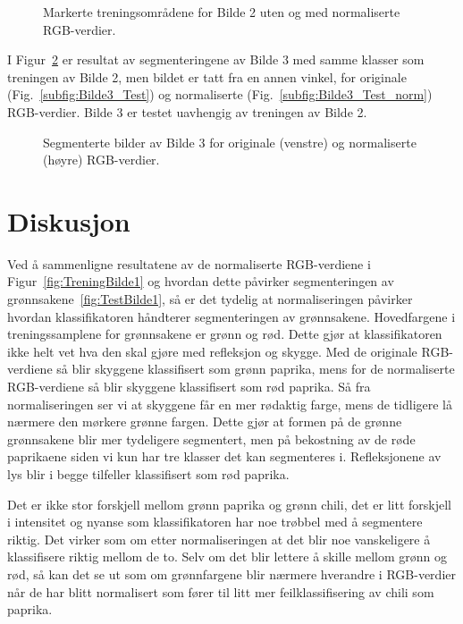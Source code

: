 \documentclass[twocolumn,norwegian]{article}
\begin{document}
	\begin{figure}[ht!]
		\centering
		\caption{Markerte treningsområdene for Bilde 2 uten og med normaliserte RGB-verdier. \label{fig:TreningBilde2}}
	\end{figure}

	I Figur~\ref{fig:TestBilde3} er resultat av segmenteringene av Bilde 3 med samme klasser som treningen av Bilde 2, men bildet er tatt fra en annen vinkel, for originale (Fig.~\ref{subfig:Bilde3_Test}) og normaliserte (Fig.~\ref{subfig:Bilde3_Test_norm}) RGB-verdier. Bilde 3 er testet uavhengig av treningen av Bilde 2.
	
	\begin{figure}[ht!]
		\centering
		\caption{Segmenterte bilder av Bilde 3 for originale (venstre) og normaliserte (høyre) RGB-verdier. \label{fig:TestBilde3}}
	\end{figure}


	\section{Diskusjon}
	Ved å sammenligne resultatene av de normaliserte RGB-verdiene i Figur~\ref{fig:TreningBilde1} og hvordan dette påvirker segmenteringen av grønnsakene~\ref{fig:TestBilde1}, så er det tydelig at normaliseringen påvirker hvordan klassifikatoren håndterer segmenteringen av grønnsakene. Hovedfargene i treningssamplene for grønnsakene er grønn og rød. Dette gjør at klassifikatoren ikke helt vet hva den skal gjøre med refleksjon og skygge. Med de originale RGB-verdiene så blir skyggene klassifisert som grønn paprika, mens for de normaliserte RGB-verdiene så blir skyggene klassifisert som rød paprika. Så fra normaliseringen ser vi at skyggene får en mer rødaktig farge, mens de tidligere lå nærmere den mørkere grønne fargen. Dette gjør at formen på de grønne grønnsakene blir mer tydeligere segmentert, men på bekostning av de røde paprikaene siden vi kun har tre klasser det kan segmenteres i. Refleksjonene av lys blir i begge tilfeller klassifisert som rød paprika.
	
	Det er ikke stor forskjell mellom grønn paprika og grønn chili, det er litt forskjell i intensitet og nyanse som klassifikatoren har noe trøbbel med å segmentere riktig. Det virker som om etter normaliseringen at det blir noe vanskeligere å klassifisere riktig mellom de to. Selv om det blir lettere å skille mellom grønn og rød, så kan det se ut som om grønnfargene blir nærmere hverandre i RGB-verdier når de har blitt normalisert som fører til litt mer feilklassifisering av chili som paprika.
\end{document}
